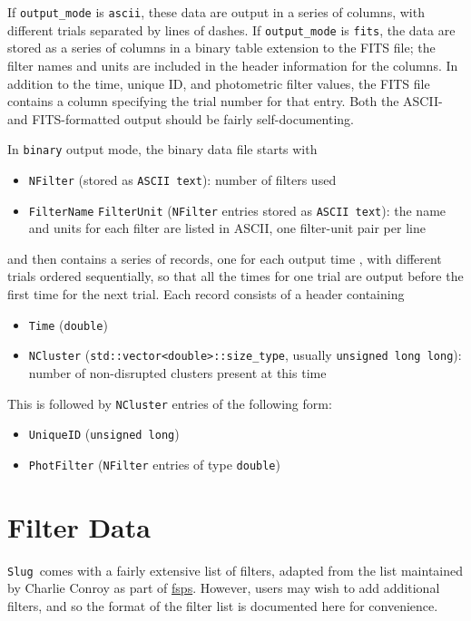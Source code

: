 \documentclass[12pt]{article}
\newcommand{\Slug}{\texttt{Slug}}
\begin{document}
If \verb=output_mode= is \verb=ascii=, these data are output in a series of columns, with different trials separated by lines of dashes. If \verb=output_mode= is \verb=fits=, the data are stored as a series of columns in a binary table extension to the FITS file; the filter names and units are included in the header information for the columns. In addition to the time, unique ID, and photometric filter values, the FITS file contains a column specifying the trial number for that entry. Both the ASCII- and FITS-formatted output should be fairly self-documenting.

In \verb=binary= output mode, the binary data file starts with
\begin{itemize}
\item \verb=NFilter= (stored as \verb=ASCII text=): number of filters used
\item \verb=FilterName= \verb=FilterUnit= (\verb=NFilter= entries stored as \verb=ASCII text=): the name and units for each filter are listed in ASCII, one filter-unit pair per line
\end{itemize}
and then contains a series of records, one for each output time , with different trials ordered sequentially, so that all the times for one trial are output before the first time for the next trial. Each record consists of a header containing
\begin{itemize}
\item \verb=Time= (\verb=double=)
\item \verb=NCluster= (\verb=std::vector<double>::size_type=, usually \verb=unsigned long long=): number of non-disrupted clusters present at this time
\end{itemize}
This is followed by \verb=NCluster= entries of the following form:
\begin{itemize}
\item \verb=UniqueID= (\verb=unsigned long=)
\item \verb=PhotFilter= (\verb=NFilter= entries of type \verb=double=)
\end{itemize}

\section{Filter Data}

\Slug\ comes with a fairly extensive list of filters, adapted from the list maintained by Charlie Conroy as part of \href{https://code.google.com/p/fsps/}{fsps}. However, users may wish to add additional filters, and so the format of the filter list is documented here for convenience.
\end{document}
